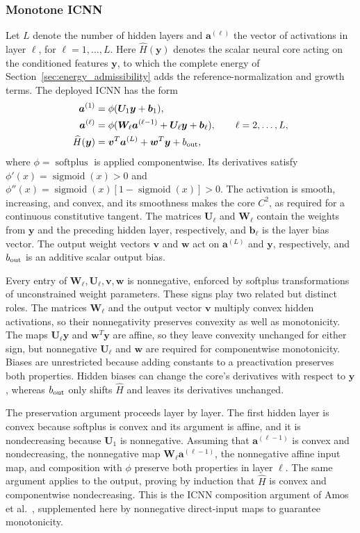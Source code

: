 \subsubsection{Monotone ICNN}
\label{sec:icnn_core}
Let $L$ denote the number of hidden layers and $\bm a^{(\ell)}$ the vector of activations in layer $\ell$, for $\ell=1,\ldots,L$. Here $\widehat H(\bm y)$ denotes the scalar neural core acting on the conditioned features $\bm y$, to which the complete energy of Section~\ref{sec:energy_admissibility} adds the reference-normalization and growth terms. The deployed ICNN has the form
\begin{align}
 \bm a^{(1)}&=\phi(\bm U_1\bm y+\bm b_1),\nonumber\\
 \bm a^{(\ell)}&=\phi(\bm W_\ell\bm a^{(\ell-1)}+\bm U_\ell\bm y+\bm b_\ell),
 \qquad \ell=2,\ldots,L,\nonumber\\
 \widehat H(\bm y)&=\bm v^T\bm a^{(L)}+\bm w^T\bm y+b_{\rm out},
 \label{eq:monotone_icnn}
\end{align}
where $\phi=\operatorname{softplus}$ is applied componentwise. Its derivatives satisfy $\phi'(x)=\operatorname{sigmoid}(x)>0$ and $\phi''(x)=\operatorname{sigmoid}(x)[1-\operatorname{sigmoid}(x)]>0$. The activation is smooth, increasing, and convex, and its smoothness makes the core $C^2$, as required for a continuous constitutive tangent. The matrices $\bm U_\ell$ and $\bm W_\ell$ contain the weights from $\bm y$ and the preceding hidden layer, respectively, and $\bm b_\ell$ is the layer bias vector. The output weight vectors $\bm v$ and $\bm w$ act on $\bm a^{(L)}$ and $\bm y$, respectively, and $b_{\rm out}$ is an additive scalar output bias.

Every entry of $\bm W_\ell,\bm U_\ell,\bm v,\bm w$ is nonnegative, enforced by softplus transformations of unconstrained weight parameters. These signs play two related but distinct roles. The matrices $\bm W_\ell$ and the output vector $\bm v$ multiply convex hidden activations, so their nonnegativity preserves convexity as well as monotonicity. The maps $\bm U_\ell\bm y$ and $\bm w^T\bm y$ are affine, so they leave convexity unchanged for either sign, but nonnegative $\bm U_\ell$ and $\bm w$ are required for componentwise monotonicity. Biases are unrestricted because adding constants to a preactivation preserves both properties. Hidden biases can change the core's derivatives with respect to $\bm y$, whereas $b_{\rm out}$ only shifts $\widehat H$ and leaves its derivatives unchanged.

The preservation argument proceeds layer by layer. The first hidden layer is convex because softplus is convex and its argument is affine, and it is nondecreasing because $\bm U_1$ is nonnegative. Assuming that $\bm a^{(\ell-1)}$ is convex and nondecreasing, the nonnegative map $\bm W_\ell\bm a^{(\ell-1)}$, the nonnegative affine input map, and composition with $\phi$ preserve both properties in layer $\ell$. The same argument applies to the output, proving by induction that $\widehat H$ is convex and componentwise nondecreasing. This is the ICNN composition argument of Amos et al.~\cite{amos2017}, supplemented here by nonnegative direct-input maps to guarantee monotonicity.

